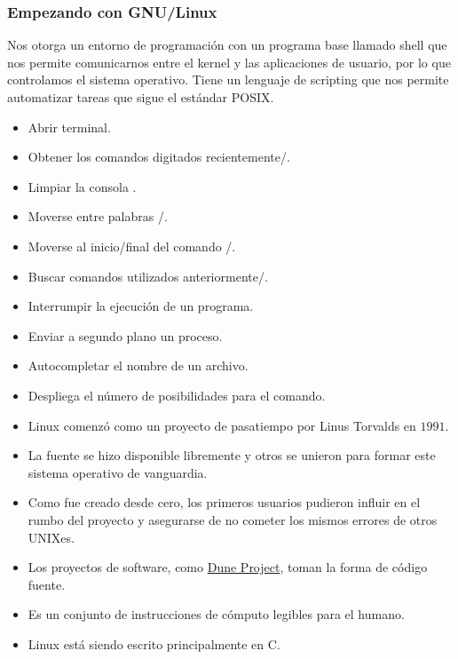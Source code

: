 \begin{frame}
	\frametitle{Empezando con GNU/Linux}
	Nos otorga un entorno de programación con un programa base llamado shell que nos permite comunicarnos entre el kernel y las aplicaciones de usuario, por lo que controlamos el sistema operativo.
	Tiene un lenguaje de scripting que nos permite automatizar tareas que sigue el estándar POSIX.

	\begin{itemize}
		\item Abrir terminal\quad{}.
		\item Obtener los comandos digitados recientemente\quad\keys{\arrowkeyup}/\keys{\arrowkeydown}.
		\item Limpiar la consola \quad{}.
		\item Moverse entre palabras \quad{}/.
		\item Moverse al inicio/final del comando \quad{}/.
		\item Buscar comandos utilizados anteriormente\quad{}/.
		\item Interrumpir la ejecución de un programa\quad{}.
		\item Enviar a segundo plano un proceso\quad{}.
		\item Autocompletar el nombre de un archivo\quad\keys{\tab}.
		\item Despliega el número de posibilidades para el comando\quad\keys{\tab+\tab}.
	\end{itemize}
\end{frame}


\begin{frame}
	\begin{itemize}
		\item
		      Linux comenzó como un proyecto de pasatiempo por Linus Torvalds en $1991$.
		\item
		      La fuente se hizo disponible libremente y otros se unieron para formar este sistema operativo de vanguardia.
		\item
		      Como fue creado desde cero, los primeros usuarios pudieron influir en el rumbo del proyecto y asegurarse de no cometer los mismos errores de otros UNIXes.
		\item
		      Los proyectos de software, como \href{https://dune-project.org}{Dune Project}, toman la forma de código fuente.
		\item
		      Es un conjunto de instrucciones de cómputo legibles para el humano.
		\item Linux está siendo escrito principalmente en C.
	\end{itemize}
\end{frame}

